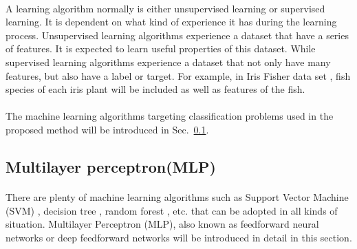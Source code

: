 \paragraph{}
A learning algorithm normally is either unsupervised learning or supervised learning.
It is dependent on what kind of experience it has during the learning process.
Unsupervised learning algorithms experience a dataset that have a series of features.
It is expected to learn useful properties of this dataset.
While supervised learning algorithms experience a dataset that not only have many features, but also have a label or target.
For example, in Iris Fisher data set \citep{Fisher1936}, fish species of each iris plant will be included as well as features of the fish. 

\paragraph{}
The machine learning algorithms targeting classification problems used in the proposed method will be introduced in Sec.~\ref{lr_sec:MLP}.

\subsection{Multilayer perceptron(MLP)}
\label{lr_sec:MLP}
\paragraph{}
There are plenty of machine learning algorithms such as Support Vector Machine (SVM) \citep{Boser1996,Cortes1995}, decision tree \citep{Olshen1984}, random forest \citep{Ho1995}, etc. that can be adopted in all kinds of situation.
Multilayer Perceptron (MLP), also known as feedforward neural networks or deep feedforward networks will be introduced in detail in this section.

